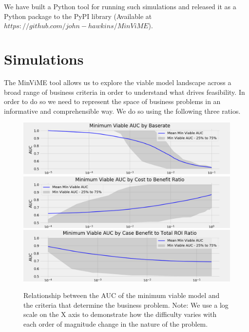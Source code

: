 \documentclass[11pt,a4paper]{article}
\begin{document}
We have built a Python tool for running such simulations and released it as a Python package
to the PyPI library (Available at $https://github.com/john-hawkins/MinViME$).

\section{Simulations}

The MinViME tool allows us to explore the viable model landscape across a broad range of business
criteria in order to understand what drives feasibility. In order to do so we need to represent
the space of business problems in an informative and comprehensible way. We do so using the following
three ratios.

\begin{figure}[!ht]
\includegraphics[scale=0.5]{images/AUC_by_Baserate.png}
\includegraphics[scale=0.5]{images/AUC_by_Cost_to_Benefit.png}
\includegraphics[scale=0.5]{images/AUC_by_Benefit_to_Total.png}
\caption{Relationship between the AUC of the minimum viable model and the criteria that determine
the business problem. Note: We use a log scale on the X axis to demonstrate how
the difficulty varies with each order of magnitude change in the nature of the problem.
}
\label{fig:threeplots}
\end{figure}
\end{document}
